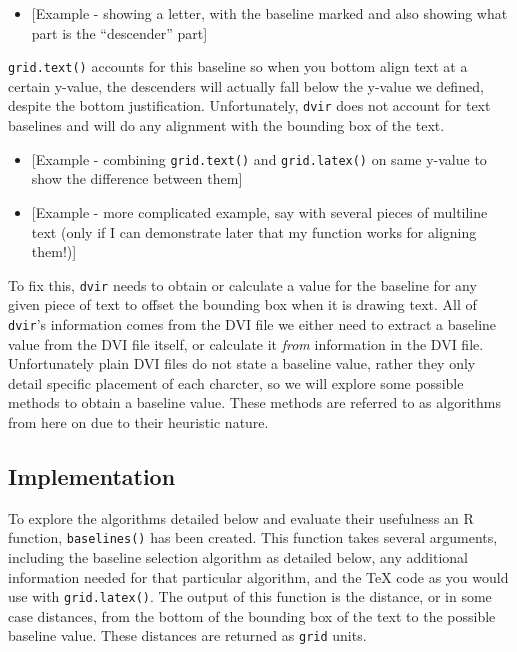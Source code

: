 \documentclass[]{article}
\providecommand{\tightlist}{%
  \setlength{\itemsep}{0pt}\setlength{\parskip}{0pt}}
\begin{document}
\begin{itemize}
\tightlist
\item
  {[}Example - showing a letter, with the baseline marked and also
  showing what part is the ``descender'' part{]}
\end{itemize}

\texttt{grid.text()} accounts for this baseline so when you bottom align
text at a certain y-value, the descenders will actually fall below the
y-value we defined, despite the bottom justification. Unfortunately,
\texttt{dvir} does not account for text baselines and will do any
alignment with the bounding box of the text.

\begin{itemize}
\item
  {[}Example - combining \texttt{grid.text()} and \texttt{grid.latex()}
  on same y-value to show the difference between them{]}
\item
  {[}Example - more complicated example, say with several pieces of
  multiline text (only if I can demonstrate later that my function works
  for aligning them!){]}
\end{itemize}

To fix this, \texttt{dvir} needs to obtain or calculate a value for the
baseline for any given piece of text to offset the bounding box when it
is drawing text. All of \texttt{dvir}'s information comes from the DVI
file we either need to extract a baseline value from the DVI file
itself, or calculate it \emph{from} information in the DVI file.
Unfortunately plain DVI files do not state a baseline value, rather they
only detail specific placement of each charcter, so we will explore some
possible methods to obtain a baseline value. These methods are referred
to as algorithms from here on due to their heuristic nature.

\subsection{Implementation}\label{implementation}

To explore the algorithms detailed below and evaluate their usefulness
an R function, \texttt{baselines()} has been created. This function
takes several arguments, including the baseline selection algorithm as
detailed below, any additional information needed for that particular
algorithm, and the \TeX{} code as you would use with
\texttt{grid.latex()}. The output of this function is the distance, or
in some case distances, from the bottom of the bounding box of the text
to the possible baseline value. These distances are returned as
\texttt{grid} units.
\end{document}
